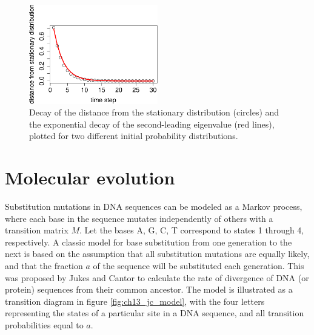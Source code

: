 \documentclass[
  letterpaper,
  DIV=11,
  numbers=noendperiod]{scrreprt}
\begin{document}
\begin{figure}[H]

{\centering \includegraphics[width=0.5\textwidth,height=\textheight]{./markov_eigen_files/figure-pdf/comp13-5-2.pdf}

}

\caption{Decay of the distance from the stationary distribution
(circles) and the exponential decay of the second-leading eigenvalue
(red lines), plotted for two different initial probability
distributions.}

\end{figure}

\hypertarget{molecular-evolution}{%
\section{Molecular evolution}\label{molecular-evolution}}

Substitution mutations in DNA sequences can be modeled as a Markov
process, where each base in the sequence mutates independently of others
with a transition matrix \(M\). Let the bases A, G, C, T correspond to
states 1 through 4, respectively. A classic model for base substitution
from one generation to the next is based on the assumption that all
substitution mutations are equally likely, and that the fraction \(a\)
of the sequence will be substituted each generation. This was proposed
by Jukes and Cantor \cite{jukes_evolution_1969} to calculate the rate of
divergence of DNA (or protein) sequences from their common ancestor. The
model is illustrated as a transition diagram in figure
\ref{fig:ch13_jc_model}, with the four letters representing the states
of a particular site in a DNA sequence, and all transition probabilities
equal to \(a\).
\end{document}
